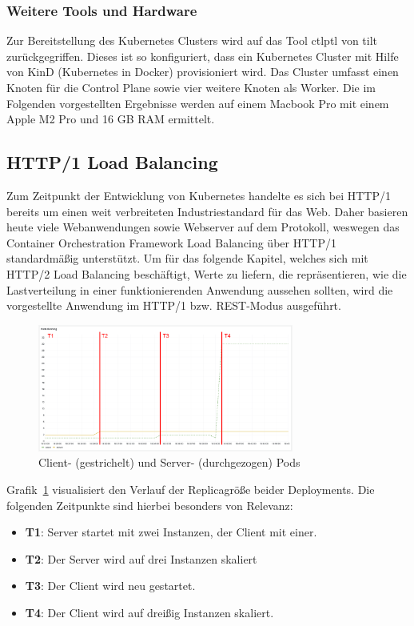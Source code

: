\subsubsection{Weitere Tools und Hardware}
Zur Bereitstellung des Kubernetes Clusters wird auf das Tool ctlptl von tilt zurückgegriffen.
Dieses ist so konfiguriert, dass ein Kubernetes Cluster mit Hilfe von KinD (Kubernetes in Docker) provisioniert wird.
Das Cluster umfasst einen Knoten für die Control Plane sowie vier weitere Knoten als Worker.
Die im Folgenden vorgestellten Ergebnisse werden auf einem Macbook Pro mit einem Apple M2 Pro und 16 GB RAM ermittelt.

\newpage

\subsection{HTTP/1 Load Balancing}\label{subsec:http/1-load-balancing}
Zum Zeitpunkt der Entwicklung von Kubernetes handelte es sich bei HTTP/1 bereits um einen weit verbreiteten Industriestandard für das Web.
Daher basieren heute viele Webanwendungen sowie Webserver auf dem Protokoll, weswegen das Container Orchestration Framework Load Balancing über HTTP/1 standardmäßig unterstützt.
Um für das folgende Kapitel, welches sich mit HTTP/2 Load Balancing beschäftigt, Werte zu liefern, die repräsentieren, wie die Lastverteilung in einer funktionierenden Anwendung aussehen sollten, wird die vorgestellte Anwendung im HTTP/1 bzw. REST-Modus ausgeführt.
\begin{figure}[H]
    \centering
    \includegraphics[width=0.75\textwidth]{img/rest_pods}
    \caption{Client- (gestrichelt) und Server- (durchgezogen) Pods}
    \label{fig:rest_pods}
\end{figure}

Grafik~\ref{fig:rest_pods} visualisiert den Verlauf der Replicagröße beider Deployments.
Die folgenden Zeitpunkte sind hierbei besonders von Relevanz:
\begin{itemize}
    \item \textbf{T1}: Server startet mit zwei Instanzen, der Client mit einer.
    \item \textbf{T2}: Der Server wird auf drei Instanzen skaliert
    \item \textbf{T3}: Der Client wird neu gestartet.
    \item \textbf{T4}: Der Client wird auf dreißig Instanzen skaliert.
\end{itemize}

